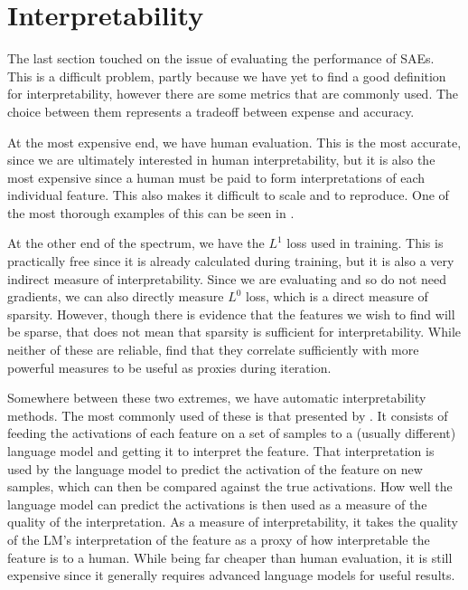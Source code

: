 \section{Interpretability}
The last section touched on the issue of evaluating the performance of SAEs.
This is a difficult problem, partly because we have yet to find a good definition for interpretability, however there are some metrics that are commonly used.
The choice between them represents a tradeoff between expense and accuracy.

At the most expensive end, we have human evaluation.
This is the most accurate, since we are ultimately interested in human interpretability, but it is also the most expensive since a human must be paid to form interpretations of each individual feature.
This also makes it difficult to scale and to reproduce.
One of the most thorough examples of this can be seen in \cite{bricken_towards_2023}.

At the other end of the spectrum, we have the $L^1$ loss used in training.
This is practically free since it is already calculated during training, but it is also a very indirect measure of interpretability.
Since we are evaluating and so do not need gradients, we can also directly measure $L^0$ loss, which is a direct measure of sparsity.
However, though there is evidence that the features we wish to find will be sparse, that does not mean that sparsity is sufficient for interpretability.
While neither of these are reliable, \cite{bricken_towards_2023} find that they correlate sufficiently with more powerful measures to be useful as proxies during iteration.

Somewhere between these two extremes, we have automatic interpretability methods.
The most commonly used of these is that presented by \cite{bills_language_2023}.
It consists of feeding the activations of each feature on a set of samples to a (usually different) language model and getting it to interpret the feature.
That interpretation is used by the language model to predict the activation of the feature on new samples, which can then be compared against the true activations.
How well the language model can predict the activations is then used as a measure of the quality of the interpretation.
As a measure of interpretability, it takes the quality of the LM's interpretation of the feature as a proxy of how interpretable the feature is to a human.
While being far cheaper than human evaluation, it is still expensive since it generally requires advanced language models for useful results.

